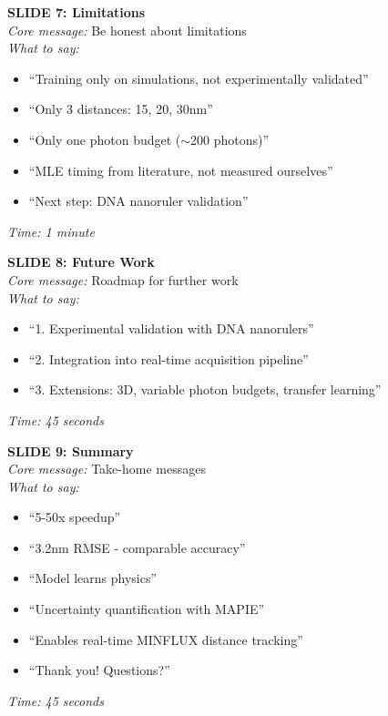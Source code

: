 \documentclass[a4paper,10pt]{article}
\begin{document}
\begin{mdframed}[style=karte]
\textbf{SLIDE 7: Limitations}\\[5pt]
\textit{Core message:} Be honest about limitations\\[5pt]
\textit{What to say:}
\begin{itemize}[leftmargin=*, nosep]
    \item ``Training only on simulations, not experimentally validated''
    \item ``Only 3 distances: 15, 20, 30nm''
    \item ``Only one photon budget ($\sim$200 photons)''
    \item ``MLE timing from literature, not measured ourselves''
    \item ``Next step: DNA nanoruler validation''
\end{itemize}
\textit{Time: 1 minute}
\end{mdframed}

\begin{mdframed}[style=karte]
\textbf{SLIDE 8: Future Work}\\[5pt]
\textit{Core message:} Roadmap for further work\\[5pt]
\textit{What to say:}
\begin{itemize}[leftmargin=*, nosep]
    \item ``1. Experimental validation with DNA nanorulers''
    \item ``2. Integration into real-time acquisition pipeline''
    \item ``3. Extensions: 3D, variable photon budgets, transfer learning''
\end{itemize}
\textit{Time: 45 seconds}
\end{mdframed}

\begin{mdframed}[style=karte]
\textbf{SLIDE 9: Summary}\\[5pt]
\textit{Core message:} Take-home messages\\[5pt]
\textit{What to say:}
\begin{itemize}[leftmargin=*, nosep]
    \item ``5-50x speedup''
    \item ``3.2nm RMSE - comparable accuracy''
    \item ``Model learns physics''
    \item ``Uncertainty quantification with MAPIE''
    \item ``Enables real-time MINFLUX distance tracking''
    \item ``Thank you! Questions?''
\end{itemize}
\textit{Time: 45 seconds}
\end{mdframed}
\end{document}

